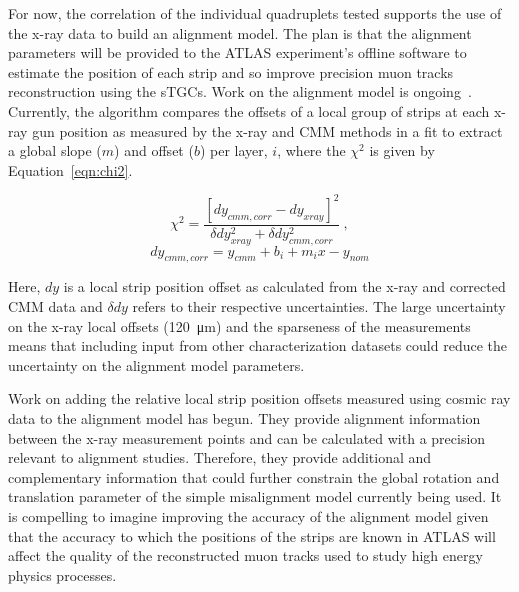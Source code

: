 For now, the correlation of the individual quadruplets tested supports the use of the x-ray data to build an alignment model. The plan is that the alignment parameters will be provided to the ATLAS experiment's offline software to estimate the position of each strip and so improve precision muon tracks reconstruction using the sTGCs. Work on the alignment model is ongoing~\cite{lefebvre_precision_2020}. Currently, the algorithm compares the offsets of a local group of strips at each x-ray gun position as measured by the x-ray and CMM methods in a fit to extract a global slope ($m$) and offset ($b$) per layer, $i$, where the $\chi^2$ is given by Equation~\ref{eqn:chi2}.

\begin{equation}
    \chi^2 = \frac{\left[dy_{cmm, corr} - dy_{xray}\right]^2}{\delta dy_{xray}^2 + \delta dy_{cmm, corr}^2}\:,
    \label{eqn:chi2}  
\end{equation}
\begin{equation}
    dy_{cmm, corr} = y_{cmm} + b_i + m_{i}x - y_{nom}
    \label{eqn:dy_cmm_corr}
\end{equation}

Here, $dy$ is a local strip position offset as calculated from the x-ray and corrected CMM data and $\delta dy$ refers to their respective uncertainties. The large uncertainty on the x-ray local offsets (\SI{120}{\micro\meter}) and the sparseness of the measurements means that including input from other characterization datasets could reduce the uncertainty on the alignment model parameters. 

Work on adding the relative local strip position offsets measured using cosmic ray data to the alignment model has begun. They provide alignment information between the x-ray measurement points and can be calculated with a precision relevant to alignment studies. Therefore, they provide additional and complementary information that could further constrain the global rotation and translation parameter of the simple misalignment model currently being used. It is compelling to imagine improving the accuracy of the alignment model given that the accuracy to which the positions of the strips are known in ATLAS will affect the quality of the reconstructed muon tracks used to study high energy physics processes.

